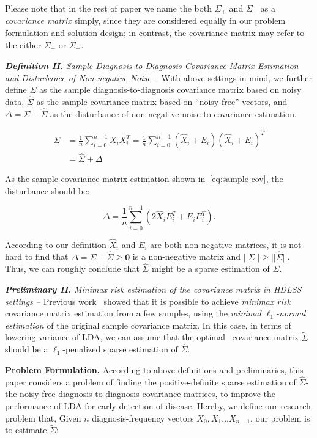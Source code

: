 Please note that in the rest of paper we name the both $\Sigma_{+}$ and $\Sigma_{-}$  as a \emph{covariance matrix} simply, since they are considered equally in our problem formulation and solution design; in contrast, the covariance matrix may refer to the either $\Sigma_{+}$ or $\Sigma_{-}$.


\textbf{\em Definition II.} \emph{Sample Diagnosis-to-Diagnosis Covariance Matrix Estimation and Disturbance of Non-negative Noise -- } With above settings in mind, we further define $\Sigma$ as the sample diagnosis-to-diagnosis covariance matrix based on noisy data, $\hat{\Sigma}$ as the sample covariance matrix based on ``noisy-free'' vectors, and  $\Delta=\Sigma-\hat{\Sigma}$ as the disturbance of non-negative noise to covariance estimation.

\begin{equation}
\begin{aligned}
\Sigma&=\frac{1}{n}\sum_{i=0}^{n-1} X_iX_i^T
=\frac{1}{n}\sum_{i=0}^{n-1} (\hat{X}_i+E_i)(\hat{X}_i+E_i)^T\\
&=\hat{\Sigma}+\Delta
\end{aligned}
\label{eq:sample-cov}
\end{equation}

As the sample covariance matrix estimation shown in~\ref{eq:sample-cov}, the disturbance should be:

$$\Delta=\frac{1}{n}\sum_{i=0}^{n-1}(2\hat{X}_iE_i^T+E_iE_i^T).$$ 

According to our definition $\hat{X}_i$ and $E_i$ are both non-negative matrices, it is not hard to find that $\Delta=\Sigma-\hat{\Sigma}\geq \textbf{0}$ is a non-negative matrix and $||\Sigma||\geq ||\hat{\Sigma}||$.
Thus, we can roughly conclude that $\hat{\Sigma}$ might be a sparse estimation of $\Sigma$.
 

\textbf{\em Preliminary II.  } \emph{Minimax risk estimation of the covariance matrix in HDLSS settings -- } Previous work~\cite{cai2012minimax,xue2012positive} showed that it is possible to achieve \emph{minimax risk} covariance matrix estimation from a few samples, using the \emph{minimal $\ell_1$-normal estimation} of the original sample covariance matrix.
In this case, in terms of lowering variance of LDA, we can assume that the optimal~\cite{cai2012minimax} covariance matrix $\tilde{\Sigma}$ should be a $\ell_1$-penalized sparse estimation of $\hat{\Sigma}$.


\textbf{Problem Formulation.  } According to above definitions and preliminaries, this paper considers a problem of finding the positive-definite sparse estimation of $\hat{\Sigma}$-the noisy-free diagnosis-to-diagnosis covariance matrices, to improve the performance of LDA for early detection of disease.
Hereby, we define our research problem that, Given $n$ diagnosis-frequency vectors $X_0,X_1\dots X_{n-1}$,  our problem is to estimate $\tilde{\Sigma}$: 

